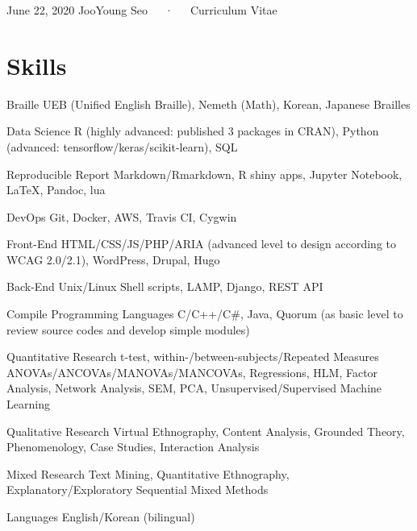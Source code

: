 \documentclass[11pt, a4paper]{awesome-cv}
\begin{document}
\makecvheader

\makecvfooter
  {June 22, 2020}
    {JooYoung Seo~~~·~~~Curriculum Vitae}
  {\thepage}





\hypertarget{skills}{%
\section{Skills}\label{skills}}

\begin{cvskills}
  \cvskill
    {Braille}
    {UEB (Unified English Braille), Nemeth (Math), Korean, Japanese Brailles}

  \cvskill
    {Data Science}
    {R (highly advanced: published 3 packages in CRAN), Python (advanced: tensorflow/keras/scikit-learn), SQL}

  \cvskill
    {Reproducible Report}
    {Markdown/Rmarkdown, R shiny apps, Jupyter Notebook, LaTeX, Pandoc, lua}

  \cvskill
    {DevOps}
    {Git, Docker, AWS, Travis CI, Cygwin}

  \cvskill
    {Front-End}
    {HTML/CSS/JS/PHP/ARIA (advanced level to design according to WCAG 2.0/2.1), WordPress, Drupal, Hugo}

  \cvskill
    {Back-End}
    {Unix/Linux Shell scripts, LAMP, Django, REST API}

  \cvskill
    {Compile Programming Languages}
    {C/C++/C\#, Java, Quorum (as basic level to review source codes and develop simple modules)}

  \cvskill
    {Quantitative Research}
    {t-test, within-/between-subjects/Repeated Measures ANOVAs/ANCOVAs/MANOVAs/MANCOVAs, Regressions, \newline HLM, Factor Analysis, Network Analysis, SEM, PCA, Unsupervised/Supervised Machine Learning}

  \cvskill
    {Qualitative Research}
    {Virtual Ethnography, Content Analysis, Grounded Theory, Phenomenology, Case Studies, Interaction Analysis}

  \cvskill
    {Mixed Research}
    {Text Mining, Quantitative Ethnography, Explanatory/Exploratory Sequential Mixed Methods}

  \cvskill
    {Languages}
    {English/Korean (bilingual)}
\end{cvskills}
\end{document}
